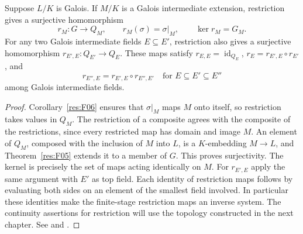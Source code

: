 \begin{proposition}
\label{res:F07}
Suppose \(L/K\) is Galois. If \(M/K\) is a Galois intermediate
extension, restriction gives a surjective homomorphism
\[
 r_M:G\longrightarrow Q_M,\qquad r_M(\sigma)=\sigma|_M,\qquad
 \ker r_M=G_M.
\]
For any two Galois intermediate fields \(E\subseteq E'\),
restriction also gives a surjective homomorphism
\(r_{E',E}:Q_{E'}\to Q_E\).
These maps satisfy \(r_{E,E}=\operatorname{id}_{Q_E}\),
\(r_E=r_{E',E}\circ r_{E'}\), and
\[
 r_{E'',E}=r_{E',E}\circ r_{E'',E'}
 \quad\text{for } E\subseteq E'\subseteq E''
\]
among Galois intermediate fields.
\end{proposition}
\begin{proof}
Corollary~\ref{res:F06} ensures that \(\sigma|_M\) maps \(M\) onto
itself, so restriction takes values in \(Q_M\).
The restriction of a composite agrees with the composite of the
restrictions, since every restricted map has domain and image \(M\).
An element of \(Q_M\), composed with the inclusion of \(M\) into \(L\),
is a \(K\)-embedding \(M\to L\), and Theorem~\ref{res:F05} extends
it to a member of \(G\). This proves surjectivity. The kernel is
precisely the set of maps acting identically on \(M\).
For \(r_{E',E}\) apply the same argument with \(E'\) as top field.
Each identity of restriction maps follows by evaluating both
sides on an element of the smallest field involved. In particular
these identities make the finite-stage restriction maps an inverse
system. The continuity assertions for restriction will use the
topology constructed in the next chapter. See
\cite[Proposition 7.7 and Example 7.26]{milne} and
\cite[Tag 0BMK]{stacks}.
\end{proof}
